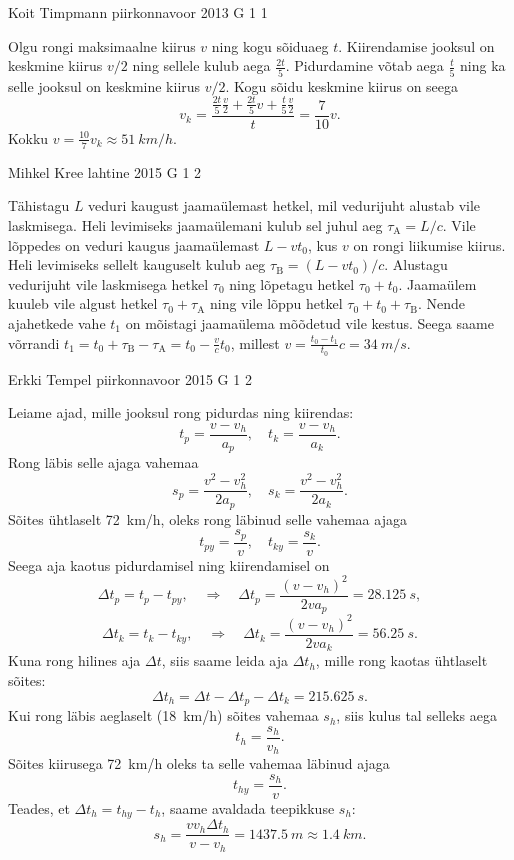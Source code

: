 \documentclass[11pt, twoside]{article}
\begin{document}
{%
{Koit Timpmann} %
{piirkonnavoor} %
{2013} %
{G 1} %
{1} %
{

\ifSolution
Olgu rongi maksimaalne kiirus $v$ ning kogu sõiduaeg $t$. Kiirendamise jooksul on keskmine kiirus $v/2$ ning sellele kulub aega $\frac{2t}{5}$. Pidurdamine võtab aega $\frac{t}{5}$ ning ka selle jooksul on keskmine kiirus $v/2$. Kogu sõidu keskmine kiirus on seega 
$$v_k = \frac{\frac{2t}{5} \frac{v}{2}+\frac{2t}{5} v + \frac{t}{5} \frac{v}{2}}{t} = \frac{7}{10} v.$$ 
Kokku $v=\frac{10}{7}v_k \approx \SI{51}{km/h}$.
\fi
}

{Mihkel Kree} %
{lahtine} %
{2015} %
{G 1} %
{2} %
{

\ifSolution
Tähistagu $L$ veduri kaugust jaamaülemast hetkel, mil vedurijuht alustab vile laskmisega. Heli levimiseks jaamaülemani kulub sel juhul aeg $\tau_\text{A}=L/c$. Vile lõppedes on veduri kaugus jaamaülemast $L-vt_0$, kus $v$ on rongi liikumise kiirus. Heli levimiseks sellelt kauguselt kulub aeg $\tau_\text{B}=(L-vt_0)/c$. Alustagu vedurijuht vile laskmisega hetkel $\tau_0$ ning lõpetagu hetkel $\tau_0+t_0$. Jaamaülem kuuleb vile algust hetkel $\tau_0+\tau_\text{A}$ ning vile lõppu hetkel $\tau_0+t_0+\tau_\text{B}$. Nende ajahetkede vahe $t_1$ on mõistagi jaamaülema mõõdetud vile kestus. Seega saame võrrandi $t_1 = t_0+\tau_\text{B}-\tau_\text{A} = t_0 - \frac{v}{c}t_0$, millest $v = \frac{t_0-t_1}{t_0}c = \SI{34}{m/s}$.
\fi
}

{Erkki Tempel} %
{piirkonnavoor} %
{2015} %
{G 1} %
{2} %
{

\ifSolution
Leiame ajad, mille jooksul rong pidurdas ning kiirendas:
\[ t_p = \frac{v - v_h}{a_p},\quad t_k = \frac{v-v_h}{a_k}. \]
Rong läbis selle ajaga vahemaa
\[ s_p = \frac{v^2-v_h^2}{2a_p}, \quad s_k = \frac{v^2-v_h^2}{2a_k}. \]
Sõites ühtlaselt \SI{72}{km/h}, oleks rong läbinud selle vahemaa ajaga
\[ t_{py} = \frac{s_p}{v},\quad t_{ky} =\frac{s_k}{v}. \]
Seega aja kaotus pidurdamisel ning kiirendamisel on 
\[ \Delta t_p =  t_{p} - t_{py}, \quad\Rightarrow\quad \Delta t_p = \frac{(v-v_h)^2}{2va_p}=\SI{28,125}{s},\]
\[ \Delta t_k =  t_{k} - t_{ky}, \quad\Rightarrow\quad \Delta t_k = \frac{(v-v_h)^2}{2va_k}=\SI{56,25}{s}.\]
Kuna rong hilines aja $\Delta t$, siis saame leida aja $\Delta t_h$, mille rong kaotas ühtlaselt sõites:
\[ \Delta t_h = \Delta t - \Delta t_p - \Delta t_k = \SI{215,625}{s}. \]
Kui rong läbis aeglaselt (\SI{18}{km/h}) sõites vahemaa $s_h$, siis kulus tal selleks aega
\[ t_h = \frac{s_h}{v_h}. \]
Sõites kiirusega \SI{72}{km/h} oleks ta selle vahemaa läbinud ajaga
\[ t_{hy} = \frac{s_h}{v}. \]
Teades, et $\Delta t_h = t_{hy} - t_h$, saame avaldada teepikkuse $s_h$:
\[ s_h = \frac{vv_h\Delta t_h}{v-v_h} = \SI{1437,5}{m} \approx \SI{1,4}{km}.\] 
\fi
}

}
\end{document}
